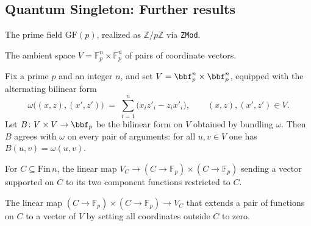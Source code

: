 \subsection*{Quantum Singleton: Further results}

\begin{definition}
\label{F}
\leanok
{}
The prime field $\mathrm{GF}(p)$, realized as $\mathbb{Z}/p\mathbb{Z}$ via \texttt{ZMod}.
\end{definition}

\begin{definition}
\label{V}
\leanok
{}
The ambient space $V = \mathbb{F}_p^n \times \mathbb{F}_p^n$ of pairs of coordinate vectors.
\end{definition}

\begin{lemma}
\label{symB_apply}
\leanok
{}
Fix a prime $p$ and an integer $n$, and set $V = \bbf_p^n \times \bbf_p^n$, equipped
with the alternating bilinear form
\[
\omega\big((x,z),(x',z')\big) \;=\; \sum_{i=1}^{n}\big(x_i z'_i - z_i x'_i\big),
\qquad (x,z),(x',z') \in V.
\]
Let $B \colon V \times V \to \bbf_p$ be the bilinear form on $V$ obtained by bundling
$\omega$. Then $B$ agrees with $\omega$ on every pair of arguments: for all $u, v \in V$
one has $B(u,v) = \omega(u,v)$.
\end{lemma}

\begin{definition}
\label{restrictToC}
\leanok
{}
For $C \subseteq \mathrm{Fin}\,n$, the linear map $V_C \to (C \to \mathbb{F}_p) \times (C \to \mathbb{F}_p)$
sending a vector supported on $C$ to its two component functions restricted to $C$.
\end{definition}

\begin{definition}
\label{extendFromC}
\leanok
{}
The linear map $(C \to \mathbb{F}_p) \times (C \to \mathbb{F}_p) \to V_C$ that extends a pair of
functions on $C$ to a vector of $V$ by setting all coordinates outside $C$ to zero.
\end{definition}

